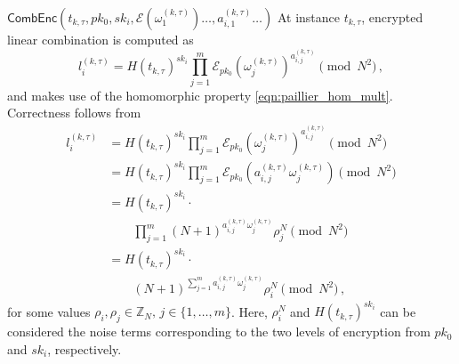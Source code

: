 \documentclass[10pt,letterpaper,oneside,twocolumn,journal]{IEEEtran}
\theoremstyle{definition}
\theoremstyle{definition}
\theoremstyle{remark}
\begin{document}
\begin{LaTeXdescription}
    \item[$\mathsf{CombEnc}(t_{k,\tau}, pk_0, sk_i, \mathcal{E}(\omega_1^{(k,\tau)})\dots , a^{(k,\tau)}_{i,1}\dots )$] At instance $t_{k,\tau}$, encrypted linear combination is computed as 
    \begin{equation}
        l^{(k,\tau)}_i = H(t_{k,\tau})^{sk_i}\prod^{m}_{j=1}\mathcal{E}_{pk_0}(\omega^{(k,\tau)}_j)^{a^{(k,\tau)}_{i,j}} \pmod{N^2}\,,\label{eqn:our_scheme_lin_comb}
    \end{equation}
    and makes use of the homomorphic property \eqref{eqn:paillier_hom_mult}. Correctness follows from
    \begin{equation*}
        \begin{split}
            l^{(k,\tau)}_i &= H(t_{k,\tau})^{sk_i}\prod^{m}_{j=1}\mathcal{E}_{pk_0}(\omega^{(k,\tau)}_j)^{a^{(k,\tau)}_{i,j}} \pmod{N^2} \\
            &= H(t_{k,\tau})^{sk_i}\prod^{m}_{j=1}\mathcal{E}_{pk_0}(a^{(k,\tau)}_{i,j}\omega^{(k,\tau)}_j) \pmod{N^2} \\
            &= H(t_{k,\tau})^{sk_i}\cdot \\
            &\qquad \prod^{m}_{j=1}(N+1)^{a^{(k,\tau)}_{i,j}\omega^{(k,\tau)}_j} \rho^{N}_{j} \pmod{N^2} \\
            &= H(t_{k,\tau})^{sk_i}\cdot \\
            &\qquad (N+1)^{\sum^{m}_{j=1}a^{(k,\tau)}_{i,j}\omega^{(k,\tau)}_j} \rho_{i}^{N} \pmod{N^2}\,,
        \end{split}
    \end{equation*}
    for some values $\rho_i,\rho_j \in \mathbb{Z}_N,\,j\in\{1,\dots,m\}$. Here, $\rho_i^N$ and $H(t_{k,\tau})^{sk_i}$ can be considered the noise terms corresponding to the two levels of encryption from $pk_0$ and $sk_i$, respectively.


\end{LaTeXdescription}
\end{document}
